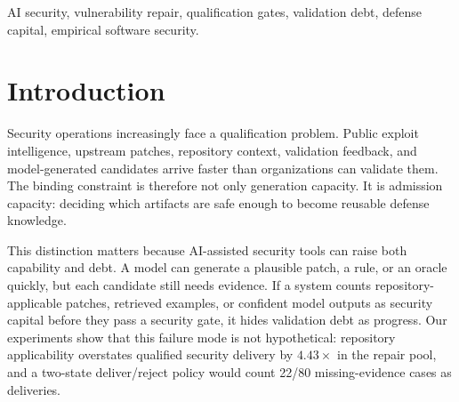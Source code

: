 ﻿\documentclass[lettersize,journal]{IEEEtran}
\begin{document}
\begin{abstract}
The boundary is also explicit. A patch-differential oracle cross-check validates 55/99 strict ASR admissions, with Wilson 95\% CI 0.457--0.650, and has a 15.1\% cross-category false-validation rate, so it is reported as boundary evidence rather than behavioral proof. To anchor the gate in executable behavior, a dynamic-oracle audit validates 23/23 parent-fails/upstream-passes tasks, with Wilson lower bound 0.857. A follow-up admission-list alignment shows that these executable anchors cover 23/30 frozen all-gate admission-list tasks (Wilson lower bound 0.590) and 20/20 tasks whose dynamic-oracle prerequisite is \texttt{experiment\_lv\_validated} (lower bound 0.839); the other sources remain partial, with 2/5 \texttt{heldout\_dynamic} and 1/5 \texttt{quality\_dynamic} covered, so seven tasks are validation debt rather than behavioral capital. The frozen 30-task all-gate repair run yields 1/30 primary security-qualified delivery and 0/30 original deployment-qualified deliveries; one same-candidate recovered-native all-gate case is reported separately as post-hoc existence evidence. The KEV activation analysis yields calibrated frontiers of 0.275 and 0.325, reproduced from saved replay curves, showing when CEC activation should fall back to AEC-only. MDDC therefore claims a reproducible measurement and admission-control method for AI defense capital, not automatic AI repair or deployment-level superiority.
\end{abstract}

\begin{IEEEkeywords}
AI security, vulnerability repair, qualification gates, validation debt, defense capital, empirical software security.
\end{IEEEkeywords}

\section{Introduction}
Security operations increasingly face a qualification problem. Public exploit intelligence, upstream patches, repository context, validation feedback, and model-generated candidates arrive faster than organizations can validate them. The binding constraint is therefore not only generation capacity. It is admission capacity: deciding which artifacts are safe enough to become reusable defense knowledge.

This distinction matters because AI-assisted security tools can raise both capability and debt. A model can generate a plausible patch, a rule, or an oracle quickly, but each candidate still needs evidence. If a system counts repository-applicable patches, retrieved examples, or confident model outputs as security capital before they pass a security gate, it hides validation debt as progress. Our experiments show that this failure mode is not hypothetical: repository applicability overstates qualified security delivery by $4.43\times$ in the repair pool, and a two-state deliver/reject policy would count 22/80 missing-evidence cases as deliveries.
\end{document}
